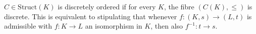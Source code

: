 $C \in \text{Struct}(K)$ is discretely ordered if for every $K$, the fibre $(C(K), \leqslant)$ is discrete. This is equivalent to stipulating that whenever $f:(K, s) \longrightarrow (L, t)$ is admissible with $f:K \longrightarrow L$ an isomorphism in $K$, then also $f^{-1}:t \longrightarrow s$.
